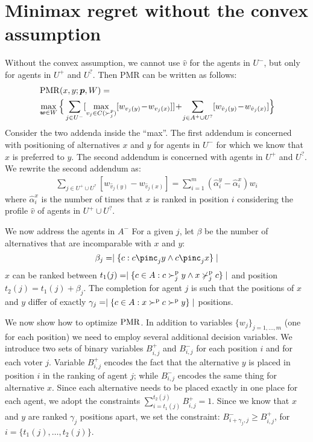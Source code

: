 \section{Minimax regret without the convex assumption}
Without the convex assumption, we cannot use $\hat{v}$ for the agents in $U^{-}$, but only for agents in $U^{+}$ and $U^{?}$.
Then PMR can be written as follows:
\begin{align*}
 &\operatorname{PMR}(x,y; {\bm{p}}, W) =\\ 
 &\max_{\bm{w} \in W} \Big \{ \sum_{j \in U^-} [\max_{v_j \in C(\succ_j^p)} [w_{v_j(y)} \!-\! w_{v_j(x)}]] 
  \!+\!	 \sum_{j \in A^+ \cup  U^?} [w_{\hat{v}_j(y)} \!-\! w_{\hat{v}_j(x)}] \Big \} 
 \end{align*}
Consider the two addenda inside the ``max''. 
The first addendum is concerned with positioning of alternatives $x$ and $y$ for agents in $U^{-}$ for which we know that $x$ is preferred to $y$.
The second addendum is concerned with agents in $U^{+}$ and $U^{?}$.
We rewrite the second addendum as:
\begin{align*}
\sum_{j \in U^+ \cup  U^?} [w_{\hat{v}_j(y)} \!-\! w_{\hat{v}_j(x)}] 
= \sum_{i = 1}^{m} (\hat{\alpha}_{i}^{y} - \hat{\alpha}_{i}^{x}) w_{i}
\end{align*}
where $\hat{\alpha}_{i}^{x}$ is the number of times that $x$ is ranked  in position $i$  considering the profile $\hat{v}$ of agents in $U^+ \cup  U^?$.

We now address the agents in $A^{-}$
For a given $j$, let $\beta$ be the number of alternatives that are incomparable with $x$ and $y$:
\[ \beta_{j} = \mid \{ c : c \pinc_{j} y \wedge c \pinc_{j} x \} \mid \]
$x$ can be ranked between $t_{1}(j)=\mid \{ c \in A : c \succ^\text{p}_{j} y \wedge x \nsucc^\text{p}_{j} c \} \mid $ and position $t_{2}(j)=t_{1}(j)+\beta_{j}$.
The completion for agent $j$ is such that the positions of $x$ and $y$ differ of exactly $\gamma_{j} =
\mid \{ c \in A : x \succ^\text{p} c \succ^\text{p} y \} \mid$ positions.


We now show how to optimize $\operatorname{PMR}$.
In addition to variables $\{ w_{j} \}_{j=1,\ldots,m}$ (one for each position) we need to employ several additional decision variables.
We introduce two sets of binary variables $B^{+}_{i,j}$ and $B^{-}_{i,j}$  for each position $i$ and for each voter $j$.
Variable $B_{i,j}^{+}$ encodes the fact that the alternative $y$ is placed in position $i$ in the ranking of agent $j$; while  $B_{i,j}^{-}$ encodes the same thing for alternative $x$.
Since each alternative needs to be placed exactly in one place for each agent, we adopt the constraints
$\sum_{i=t_{1}(j)}^{t_{2}(j)} B_{i,j}^{+} = 1$.
Since we know that $x$ and $y$ are ranked $\gamma_{j}$ positions apart, we set the constraint:
$B_{i+\gamma_{j},j}^{-} \geq B_{i,j}^{+}$,  for $i = \{ t_{1}(j), \ldots, t_{2}(j)\}$.

